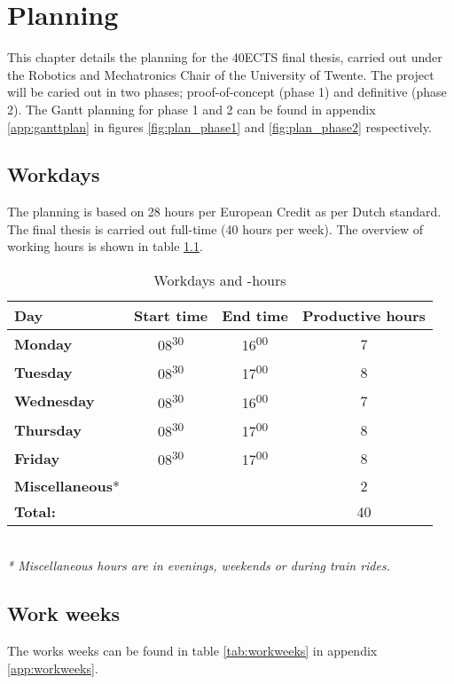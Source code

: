 \chapter{Planning}
\label{ch:Planning}

This chapter details the planning for the 40ECTS final thesis, carried out under the Robotics and Mechatronics Chair of the University of Twente. The project will be caried out in two phases; proof-of-concept (phase 1) and definitive (phase 2). The Gantt planning for phase 1 and 2 can be found in appendix \ref{app:ganttplan} in figures \ref{fig:plan_phase1} and \ref{fig:plan_phase2} respectively.
\section{Workdays}
The planning is based on 28 hours per European Credit as per Dutch standard. The final thesis is carried out full-time (40 hours per week). The overview of working hours is shown in table \ref{tab:workdays}.
\begin{table} [h!]
	\begin{tabular}{l|ccc}
		\textbf{Day} 	&	Start time 		&	End time	&	Productive hours \\
		\hline
		\textbf{Monday} 		&	08\textsuperscript{30}	&	16\textsuperscript{00}	& 7 \\
		\rowcolor{Gray}
		\textbf{Tuesday} 	&	08\textsuperscript{30} 	&	17\textsuperscript{00}	& 8 \\
		\textbf{Wednesday} 	&	08\textsuperscript{30}	&	16\textsuperscript{00}	& 7 \\
		\rowcolor{Gray}
		\textbf{Thursday}	&	08\textsuperscript{30}	&	17\textsuperscript{00}	& 8 \\
		\textbf{Friday}		&	08\textsuperscript{30}	&	17\textsuperscript{00}	& 8 \\
		\rowcolor{Gray}
		\textbf{Miscellaneous}* & 		& 			& 2 \\
		\hline
		\textbf{Total:} 	&			&			& 40\\
	\end{tabular} \\
	\textit{* Miscellaneous hours are in evenings, weekends or during train rides.}
	\caption{Workdays and -hours}
	\label{tab:workdays}
\end{table}

\section{Work weeks}
The works weeks can be found in table \ref{tab:workweeks} in appendix \ref{app:workweeks}.

